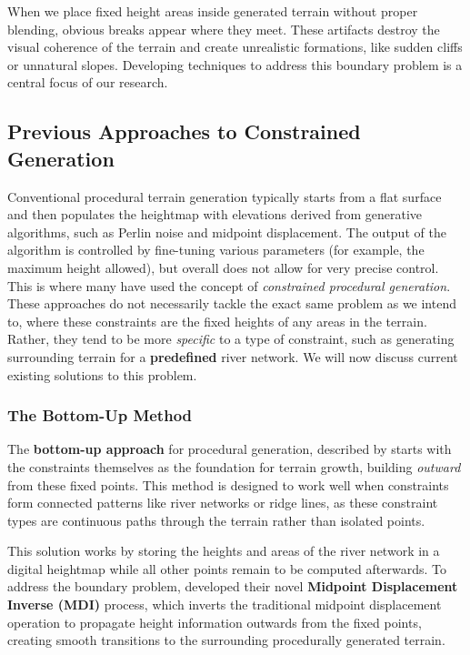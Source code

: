 When we place fixed height areas inside generated terrain without proper blending, obvious breaks appear where they meet. These artifacts destroy the visual coherence of the terrain and create unrealistic formations, like sudden cliffs or unnatural slopes. Developing techniques to address this boundary problem is a central focus of our research.


\subsection{Previous Approaches to Constrained Generation}

Conventional procedural terrain generation typically starts from a flat surface and then populates the heightmap with elevations derived from generative algorithms, such as Perlin noise and midpoint displacement. The output of the algorithm is controlled by fine-tuning various parameters (for example, the maximum height allowed), but overall does not allow for very precise control.  This is where many have used the concept of \textit{constrained procedural generation}. These approaches do not necessarily tackle the exact same problem as we intend to, where these constraints are the fixed heights of any areas in the terrain. Rather, they tend to be more \textit{specific} to a type of constraint, such as generating surrounding terrain for a \textbf{predefined} river network. We will now discuss current existing solutions to this problem. 

\subsubsection{The Bottom-Up Method}
\label{bottom_up_method}

The \textbf{bottom-up approach} for procedural generation, described by \textcite{Belhadj07,} starts with the constraints themselves as the foundation for terrain growth, building \textit{outward} from these fixed points. This method is designed to work well when constraints form connected patterns like river networks or ridge lines, as these constraint types are continuous paths through the terrain rather than isolated points.

This solution works by storing the heights and areas of the river network in a digital heightmap while all other points remain to be computed afterwards. To address the boundary problem, \textcite{Belhadj07} developed their novel \textbf{Midpoint Displacement Inverse (MDI)} process, which inverts the traditional midpoint displacement operation to propagate height information outwards from the fixed points, creating smooth transitions to the surrounding procedurally generated terrain.

